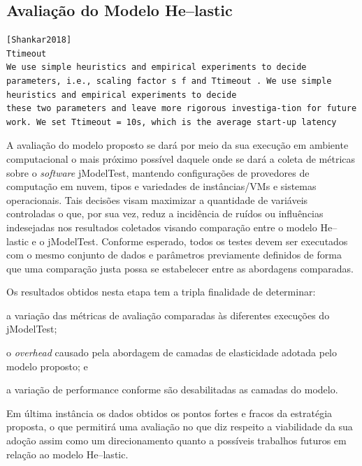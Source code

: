 \documentclass[english,brazilian]{UNISINOSmonografia} %
\begin{document}
\subsection{Avaliação do Modelo \textsf{He}--lastic}
\label{sec:metodologia-etapas-modelo}

\begin{verbatim}
[Shankar2018]
Ttimeout
We use simple heuristics and empirical experiments to decide
parameters, i.e., scaling factor s f and Ttimeout . We use simple heuristics and empirical experiments to decide
these two parameters and leave more rigorous investiga-tion for future work. We set Ttimeout = 10s, which is the average start-up latency
\end{verbatim}


A avaliação do modelo proposto se dará por meio da sua execução em ambiente computacional o mais próximo possível daquele onde se dará a coleta de métricas sobre o \textit{software} jModelTest, mantendo configurações de provedores de computação em nuvem, tipos e variedades de instâncias/VMs e sistemas operacionais.
Tais decisões visam maximizar a quantidade de variáveis controladas o que, por sua vez, reduz a incidência de ruídos ou influências indesejadas nos resultados coletados visando comparação entre o modelo \textsf{He}--lastic e o jModelTest.
Conforme esperado, todos os testes devem ser executados com o mesmo conjunto de dados e parâmetros previamente definidos de forma que uma comparação justa possa se estabelecer entre as abordagens comparadas.



Os resultados obtidos nesta etapa tem a tripla finalidade de determinar:
\begin{inparaenum}[\itshape 1\upshape)] 
	\item a variação das métricas de avaliação comparadas às diferentes execuções do jModelTest;  
	\item o \textit{overhead} causado pela abordagem de camadas de elasticidade adotada pelo modelo proposto; e
	\item a variação de performance conforme são desabilitadas as camadas do modelo.
\end{inparaenum}
Em última instância os dados obtidos os pontos fortes e fracos da estratégia proposta, o que permitirá uma avaliação no que diz respeito a viabilidade da sua adoção assim como um direcionamento quanto a possíveis trabalhos futuros em relação ao modelo \textsf{He}--lastic.
\end{document}
